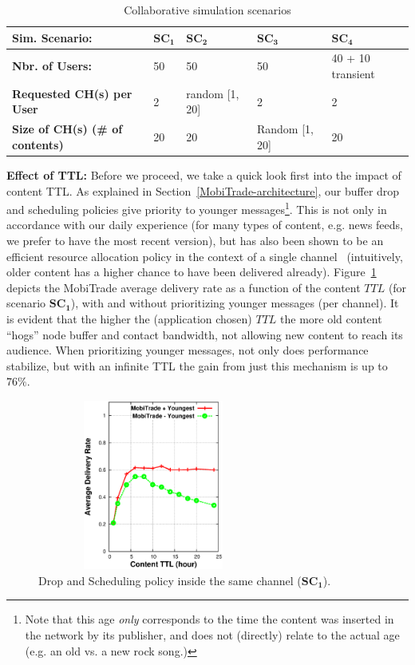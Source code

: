\begin{table}[!h]
\vspace{-0.1in}
\caption{Collaborative simulation scenarios}
\centering
\label{table:c-sim-sce}
\footnotesize
\begin{tabular}{|p{3cm}|p{2cm}|p{2cm}|p{2cm}|p{2cm}|}
\hline
\bfseries Sim. Scenario: & $\mathbf{SC_1}$ & $\mathbf{SC_2}$ & $\mathbf{SC_3}$&  $\mathbf{SC_4}$ \\
\hline
\bfseries Nbr. of Users: & 50 & 50 & 50 & 40 + 10 transient\\
\hline
\bfseries Requested CH(s) per User & 2 & random [1, 20]& 2& 2\\
\hline
\bfseries Size of CH(s) (\# of contents) &20  &20 &Random [1, 20]&20 \\
\hline
\end{tabular}
\end{table}

\noindent \textbf{Effect of TTL:} Before we proceed, we take a quick look first into the impact of content TTL. As explained in Section~\ref{MobiTrade-architecture}, our buffer drop and scheduling policies give priority to younger messages\footnote{Note that this age \emph{only} corresponds to the time the content was inserted in the network by its publisher, and does not (directly) relate to the actual age (e.g. an old vs. a new rock song.)}. This is not only in accordance with our daily experience (for many types of content, e.g. news feeds, we prefer to have the most recent version), but has also been shown to be an efficient resource allocation policy in the context of a single channel~\cite{TMC:Report} (intuitively, older content has a higher chance to have been delivered already). Figure~\ref{DO} depicts the MobiTrade average delivery rate as a function of the content $TTL$ (for scenario $\mathbf{SC_1}$), with and without prioritizing younger messages (per channel). It is evident that the higher the (application chosen) $TTL$ the more old content ``hogs'' node buffer and contact bandwidth, not allowing new content to reach its audience. When prioritizing younger messages, not only does performance stabilize, but with an infinite TTL the gain from just this mechanism is up to $76\%$.

\begin{figure}[!h]
  \begin{center}
    \includegraphics[width=3in,height=2.2in]{Chapitre5/fig3.eps}
  \end{center}
  \caption{Drop and Scheduling policy inside the same channel ($\mathbf{SC_1}$).}
  \label{DO}
\end{figure}

